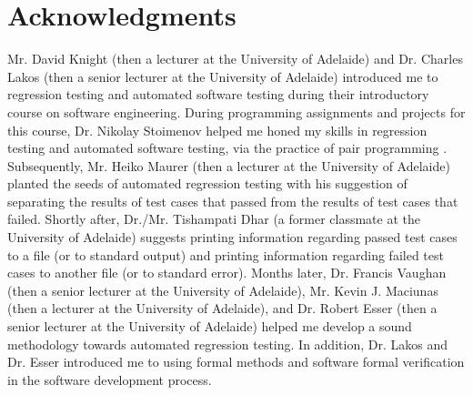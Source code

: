 \documentclass[letter,12pt]{article}
\begin{document}
\section*{Acknowledgments}
\label{sec:Acknowledgments}


Mr. David Knight (then a lecturer at the University of Adelaide) and Dr. Charles Lakos (then a senior lecturer at the University of Adelaide) introduced me to regression testing and automated software testing during their introductory course on software engineering. During programming assignments and projects for this course, Dr. Nikolay Stoimenov helped me honed my skills in regression testing and automated software testing, via the practice of pair programming \cite{DeOrio2016,Fox2013,Oram2011,Jalote2008,Shore2008,Wiegers2002}. Subsequently, Mr. Heiko Maurer (then a lecturer at the University of Adelaide) planted the seeds of automated regression testing with his suggestion of separating the results of test cases that passed from the results of test cases that failed. Shortly after, Dr./Mr. Tishampati Dhar (a former classmate at the University of Adelaide) suggests printing information regarding passed test cases to a file (or to standard output) and printing information regarding failed test cases to another file (or to standard error). Months later, Dr. Francis Vaughan (then a senior lecturer at the University of Adelaide), Mr. Kevin J. Maciunas (then a lecturer at the University of Adelaide), and Dr. Robert Esser (then a senior lecturer at the University of Adelaide) helped me develop a sound methodology towards automated regression testing. In addition, Dr. Lakos and Dr. Esser introduced me to using formal methods and software formal verification in the software development process.
\end{document}
